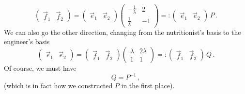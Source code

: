 {$$
\begin{pmatrix}\vec f_1 & \vec f_2\end{pmatrix}
=
\begin{pmatrix}\vec e_1 & \vec e_2\end{pmatrix}
\begin{pmatrix}-\frac1\lambda & 2\\ \frac1\lambda & -1
\end{pmatrix} =:\begin{pmatrix}\vec e_1 & \vec e_2\end{pmatrix} \, P\, .
$$
We can also go the other direction, changing from the nutritionist's basis to the  engineer's basis
$$
\begin{pmatrix}\vec e_1 & \vec e_2\end{pmatrix}
=
\begin{pmatrix}\vec f_1 & \vec f_2\end{pmatrix}
\begin{pmatrix}\lambda & 2\lambda \\ 1 & 1
\end{pmatrix} =:\begin{pmatrix}\vec f_1 & \vec f_2\end{pmatrix} \, Q\, .
$$
Of course, we must have 
$$
Q=P^{-1}\, ,
$$
(which is in fact how we constructed $P$ in the first place).

}
